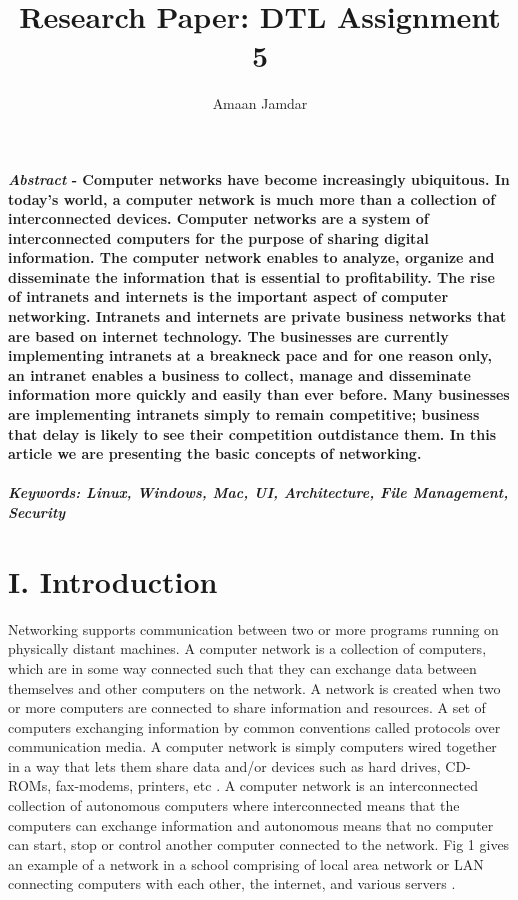 \documentclass[12pt]{article}
\title{\textbf {Research Paper: DTL Assignment 5}}
\author{Amaan Jamdar}
\begin{document}
\maketitle
\clearpage

\begin{multicols*}{2}


\textbf{{\it  Abstract} - Computer
networks have become increasingly ubiquitous. In today's world, a computer network is much more than a collection of
interconnected devices. Computer networks are a
system of interconnected computers for the purpose of
sharing digital information. The computer network
enables to analyze, organize and disseminate the
information that is essential to profitability. The rise of
intranets and internets is the important aspect of
computer networking. Intranets and internets are private
business networks that are based on internet
technology. The businesses are currently implementing
intranets at a breakneck pace and for one reason only,
an intranet enables a business to collect, manage and
disseminate information more quickly and easily than
ever before. Many businesses are implementing
intranets simply to remain competitive; business that
delay is likely to see their competition outdistance
them. In this article we are presenting the basic
concepts of networking.\\ \\
\textit{Keywords: Linux, Windows, Mac, UI, Architecture, File
Management, Security}} \\


\section*{I. Introduction}
\indent \indent Networking supports communication between
two or more programs running on physically distant
machines. A computer network is a collection of
computers, which are in some way connected such that
they can exchange data between themselves and other
computers on the network. A network is created when
two or more computers are connected to share
information and resources. A set of computers
exchanging information by common conventions called
protocols over communication media. A computer
network is simply computers wired together in a way
that lets them share data and/or devices such as hard
drives, CD-ROMs, fax-modems, printers, etc \cite{2}. A
computer network is an interconnected collection of
autonomous computers where interconnected means
that the computers can exchange information and
autonomous means that no computer can start, stop or
control another computer connected to the network. Fig
1 gives an example of a network in a school comprising
of local area network or LAN connecting computers with each other, the internet, and various servers \cite{4}.\\


\end{multicols*}
\end{document}
